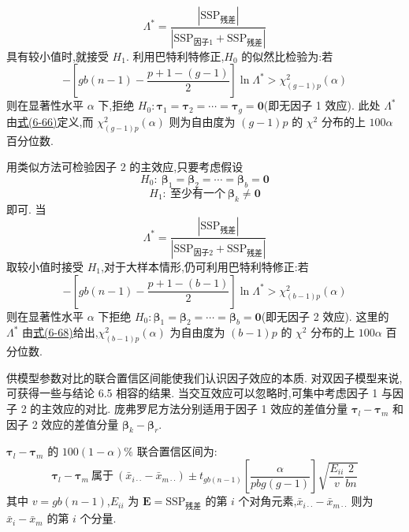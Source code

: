 \label{eq:6-66}
\begin{equation}
\Lambda^{*}=\frac{|\mathrm{SSP}_{\text{残差}}|}{|\mathrm{SSP}_{\text{因子1}}+\mathrm{SSP}_{\text{残差}}|}
\tag{6-66}
\end{equation}
具有较小值时,就接受 $H_1$. 利用巴特利特修正,$H_0$ 的似然比检验为:若
\label{eq:6-67}
\begin{equation}
-\left[gb(n-1)-\frac{p+1-(g-1)}{2}\right]\ln\Lambda^{*}>\chi_{(g-1)p}^{2}(\alpha)
\tag{6-67}
\end{equation}
则在显著性水平 $\alpha$ 下,拒绝 $H_0:\boldsymbol{\tau}_1=\boldsymbol{\tau}_2=\cdots=\boldsymbol{\tau}_g=\mathbf{0}$(即无因子 1 效应). 此处 $\Lambda^{*}$ 由\hyperref[eq:6-66]{式(6-66)}定义,而 $\chi_{(g-1)p}^{2}(\alpha)$ 则为自由度为 $(g-1)p$ 的 $\chi^{2}$ 分布的上 $100\alpha$ 百分位数.

用类似方法可检验因子 2 的主效应,只要考虑假设
\[
H_0:\ \boldsymbol{\beta}_1=\boldsymbol{\beta}_2=\cdots=\boldsymbol{\beta}_b=\mathbf{0}
\]
\[
H_1:\ \text{至少有一个}\ \boldsymbol{\beta}_k\neq\mathbf{0}
\]
即可. 当
\label{eq:6-68}
\begin{equation}
\Lambda^{*}=\frac{|\mathrm{SSP}_{\text{残差}}|}{|\mathrm{SSP}_{\text{因子2}}+\mathrm{SSP}_{\text{残差}}|}
\tag{6-68}
\end{equation}
取较小值时接受 $H_1$,对于大样本情形,仍可利用巴特利特修正:若
\label{eq:6-69}
\begin{equation}
-\left[gb(n-1)-\frac{p+1-(b-1)}{2}\right]\ln\Lambda^{*}>\chi_{(b-1)p}^{2}(\alpha)
\tag{6-69}
\end{equation}
则在显著性水平 $\alpha$ 下拒绝 $H_0:\boldsymbol{\beta}_1=\boldsymbol{\beta}_2=\cdots=\boldsymbol{\beta}_b=\mathbf{0}$(即无因子 2 效应). 这里的 $\Lambda^{*}$ 由\hyperref[eq:6-68]{式(6-68)}给出,$\chi_{(b-1)p}^{2}(\alpha)$ 为自由度为 $(b-1)p$ 的 $\chi^{2}$ 分布的上 $100\alpha$ 百分位数.

供模型参数对比的联合置信区间能使我们认识因子效应的本质. 对双因子模型来说,可获得一些与结论 6.5 相容的结果. 当交互效应可以忽略时,可集中考虑因子 1 与因子 2 的主效应的对比. 庞弗罗尼方法分别适用于因子 1 效应的差值分量 $\boldsymbol{\tau}_l-\boldsymbol{\tau}_m$ 和因子 2 效应的差值分量 $\boldsymbol{\beta}_k-\boldsymbol{\beta}_r$.

$\boldsymbol{\tau}_l-\boldsymbol{\tau}_m$ 的 $100(1-\alpha)\%$ 联合置信区间为:
\label{eq:6-70}
\begin{equation}
\boldsymbol{\tau}_l-\boldsymbol{\tau}_m\ \text{属于}\ (\bar{x}_{i\cdot\cdot}-\bar{x}_{m\cdot\cdot})\pm t_{gb(n-1)}\left[\frac{\alpha}{pbg(g-1)}\right]\sqrt{\frac{E_{ii}}{v}\frac{2}{bn}}
\tag{6-70}
\end{equation}
其中 $v=gb(n-1)$,$E_{ii}$ 为 $\mathbf{E}=\mathrm{SSP}_{\text{残差}}$ 的第 $i$ 个对角元素,$\bar{x}_{i\cdot\cdot}-\bar{x}_{m\cdot\cdot}$ 则为 $\bar{x}_i-\bar{x}_m$ 的第 $i$ 个分量.

